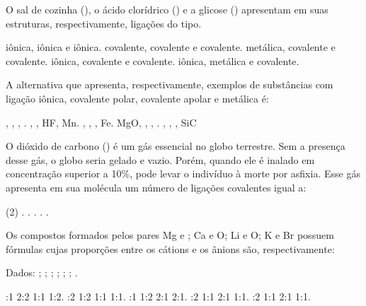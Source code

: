 \documentclass[9qpt]{scrartcl}
\begin{document}
\begin{exercise}[points=1.0]
O sal de cozinha (), o ácido clorídrico () e a glicose () apresentam em suas estruturas, respectivamente, ligações do tipo.

\begin{choice}
\choice iônica, iônica e iônica.
\choice covalente, covalente e covalente.
\choice metálica, covalente e covalente.
\choice iônica, covalente e covalente.
\choice iônica, metálica e covalente.
\end{choice}
\end{exercise}




\begin{exercise}[points=1.0]
A alternativa que apresenta, respectivamente, exemplos de substâncias com ligação iônica, covalente polar, covalente apolar e metálica é:
\begin{choice}
\choice {}, , , .
\choice {}, , HF, Mn.
\choice {}, , , Fe.
\choice MgO, , , .
\choice {}, , , SiC
\end{choice}
\end{exercise}



\begin{exercise}[points=1.0]
O dióxido de carbono () é um gás essencial no globo terrestre. Sem a presença desse gás, o globo seria gelado e vazio. Porém, quando ele é inalado em concentração superior a 10\%, pode levar o indivíduo à morte por asfixia. Esse gás apresenta em sua molécula um número de ligações covalentes igual a:

\begin{choice}(2)
.
.
.
.
.
\end{choice}
\end{exercise}


\begin{exercise}[points=1.0]
Os compostos formados pelos pares Mg e ; Ca e O; Li e O; K e Br possuem fórmulas cujas proporções entre os cátions e os ânions são, respectivamente:

Dados: ; ; ; ; ; ; .

\begin{choice}
:1     2:2     1:1     1:2.
:2     1:2     1:1     1:1.
:1     1:2     2:1     2:1.
:2     1:1     2:1     1:1.
:2     1:1     2:1     1:1.
\end{choice}
\end{exercise}
\end{document}
